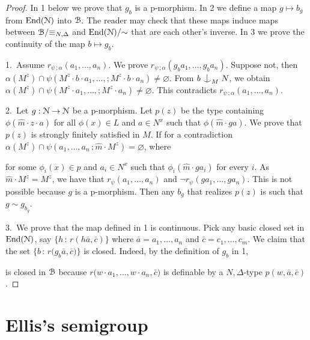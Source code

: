 \begin{proof}
  In 1 below we prove that $g_b$ is a p-morphism.
  In 2 we define a map $g\mapsto b_g$ from ${\rm End}(\EuScript N)$ into $\EuScript B$.
  The reader may check that these maps induce maps between $\EuScript B/{\equiv_{N,\Delta}}$ and ${\rm End}(\EuScript N)/{\sim}$ that are each other's inverse.
  In 3 we prove the continuity of the map $b\mapsto g_b$.

  1.\ 
  Assume $r_{\psi\,;\alpha}(a_1,\dots,a_n)$.
  We prove $r_{\psi\,;\alpha}(g_ba_1,\dots,g_ba_n)$.
  Suppose not, then $\alpha(M^z)\cap\psi(M^z\cdot b\cdot a_1,\dots,;M^z\cdot b\cdot a_n)\neq\varnothing$.
  From  $b\nonfork_MN$, we obtain $\alpha(M^z)\cap\psi(M^z\cdot a_1,\dots,;M^z\cdot a_n)\neq\varnothing$.
  This contradicts $r_{\psi\,;\alpha}(a_1,\dots,a_n)$.
  
  2.\ 
  Let $g:\EuScript N\to\EuScript N$ be a p-morphism.
  Let $p(z)$ be the type containing $\phi(\hat m\cdot z\cdot a)$ for all $\phi(x)\in L$ and $a\in N^x$ such that $\phi(\hat m\cdot ga)$.
  We prove that $p(z)$ is strongly finitely satisfied in $M$.
  If for a contradiction $\alpha(M^z)\cap\psi(a_1,\dots,a_n\,;\hat m\cdot M^z)=\varnothing$, where 

  \ceq{\hfill\psi(x_1,\dots,x_n\,;z)}{=}{\bigwedge_{i=1}^n\phi_i(z\cdot x_i)}

  for some $\phi_i(x)\in p$ and $a_i\in N^x$ such that $\phi_i(\hat m\cdot g\!a_i)$ for every $i$.
  As $\hat m\cdot M^z=M^z$, we have that $r_\psi(a_1,\dots,a_n)$ and $\neg r_\psi(g\!a_1,\dots,g\!a_n)$.
  This is not possible because $g$ is a p-morphism.
  Then any $b_g$ that realizes $p(z)$ is such that $g\sim g_{b_g}$.
 
  3.\ 
  We prove that the map defined in 1 is continuous.
  Pick any basic closed set in ${\rm End}(\EuScript N)$, say $\big\{ h\, :\, r(h\bar a,\bar c)\big\}$ where $\bar a=a_1,\dots,a_n$ and $\bar c=c_1,\dots,c_m$.
  We claim that the set $\big\{b\, :\, r(g_b\bar a,\bar c\big)\}$ is closed.
  Indeed, by the definition of $g_b$ in 1,

  
  is closed in $\EuScript B$ because $r\big(w\cdot a_1,\dots,w\cdot a_n,\bar c\big)$ is definable by a $N,\Delta$-type $p(w,\bar a,\bar c)$.
\end{proof}

\section{Ellis's semigroup}

